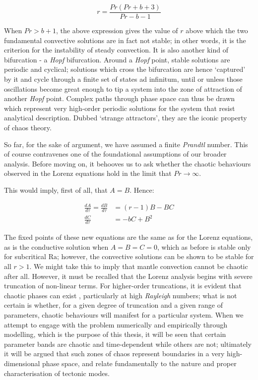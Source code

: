 \documentclass[a4paper,11pt,oneside]{book}
\begin{document}
\begin{equation}
r = \frac{Pr \left( Pr + b + 3 \right)}{Pr - b - 1}
\end{equation}

When $Pr>b+1$, the above expression gives the value of $r$ above which the two fundamental convective solutions are in fact not stable; in other words, it is the criterion for the instability of steady convection. It is also another kind of bifurcation - a \textit{Hopf} bifurcation. Around a \textit{Hopf} point, stable solutions are periodic and cyclical; solutions which cross the bifurcation are hence `captured' by it and cycle through a finite set of states ad infinitum, until or unless those oscillations become great enough to tip a system into the zone of attraction of another \textit{Hopf} point. Complex paths through phase space can thus be drawn which represent very high-order periodic solutions for the system that resist analytical description. Dubbed `strange attractors', they are the iconic property of chaos theory.

So far, for the sake of argument, we have assumed a finite \textit{Prandtl} number. This of course contravenes one of the foundational assumptions of our broader analysis. Before moving on, it behooves us to ask whether the chaotic behaviours observed in the Lorenz equations hold in the limit that $Pr\to\infty$.

This would imply, first of all, that $A=B$. Hence:

\begin{align*}
\frac{d A}{d \tau} = \frac{d B}{d \tau} &= \left( r - 1 \right) B - BC \\
\frac{d C}{d \tau} &= -bC + B^2
\end{align*}

The fixed points of these new equations are the same as for the Lorenz equations, as is the conductive solution when $A=B=C=0$, which as before is stable only for subcritical $\mathrm{Ra}$; however, the convective solutions can be shown to be stable for all $r>1$. We might take this to imply that mantle convection cannot be chaotic after all. However, it must be recalled that the Lorenz analysis begins with severe truncation of non-linear terms. For higher-order truncations, it is evident that chaotic phases can exist \cite{Schubert2001-ea}, particularly at high \textit{Rayleigh} numbers; what is not certain is whether, for a given degree of truncation and a given range of parameters, chaotic behaviours will manifest for a particular system. When we attempt to engage with the problem numerically and empirically through modelling, which is the purpose of this thesis, it will be seen that certain parameter bands are chaotic and time-dependent while others are not; ultimately it will be argued that such zones of chaos represent boundaries in a very high-dimensional phase space, and relate fundamentally to the nature and proper characterisation of tectonic modes.
\end{document}
